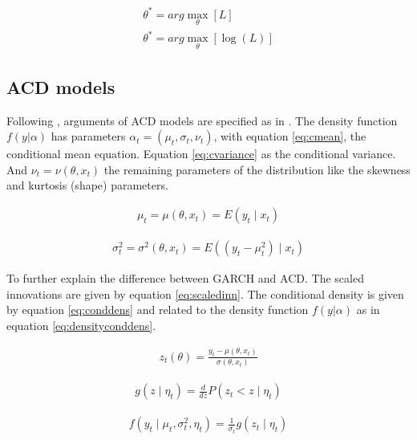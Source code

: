 \documentclass[a4paper, twoside]{templates/ociamthesis}
\begin{document}
\begin{align} 
\theta^{*} = arg \max_{\theta} [ L] \\
\theta^{*} = arg \max_{\theta} [\log(L)]
 \label{eq:optim}
\end{align}

\hypertarget{acd-models-meth}{%
\subsection{ACD models}\label{acd-models-meth}}

\noindent Following \textcite{ghalanos2016}, arguments of ACD models are specified as in \textcite{hansen1994}. The density function \(f(y|\alpha)\) has parameters \(\alpha_t = (\mu_t, \sigma_t, \nu_t)\), with equation \eqref{eq:cmean}, the conditional mean equation. Equation \eqref{eq:cvariance} as the conditional variance. And \(\nu_t=\nu(\theta,x_t)\) the remaining parameters of the distribution like the skewness and kurtosis (shape) parameters.

\begin{align} 
\mu_{t}=\mu\left(\theta, x_{t}\right)=E\left(y_{t} \mid x_{t}\right)
 \label{eq:cmean}
\end{align}

\begin{align}
\sigma_{t}^{2}=\sigma^{2}\left(\theta, x_{t}\right)=E\left(\left(y_{t}-\mu_{t}^{2}\right) \mid x_{t}\right)
 \label{eq:cvariance}
\end{align}

\noindent To further explain the difference between GARCH and ACD. The scaled innovations are given by equation \eqref{eq:scaledinn}. The conditional density is given by equation \eqref{eq:conddens} and related to the density function \(f(y|\alpha)\) as in equation \eqref{eq:densityconddens}.

\begin{align}
z_{t}(\theta)=\frac{y_{t}-\mu\left(\theta, x_{t}\right)}{\sigma\left(\theta, x_{t}\right)}
\label{eq:scaledinn}
\end{align}

\begin{align}
g\left(z \mid \eta_{t}\right)=\frac{d}{d z} P\left(z_{t}<z \mid \eta_{t}\right)
\label{eq:conddens}
\end{align}

\begin{align}
f\left(y_{t} \mid \mu_{t}, \sigma_{t}^{2}, \eta_{t}\right)=\frac{1}{\sigma_{t}} g\left(z_{t} \mid \eta_{t}\right)
\end{align}
\label{eq:densityconddens}
\end{document}
